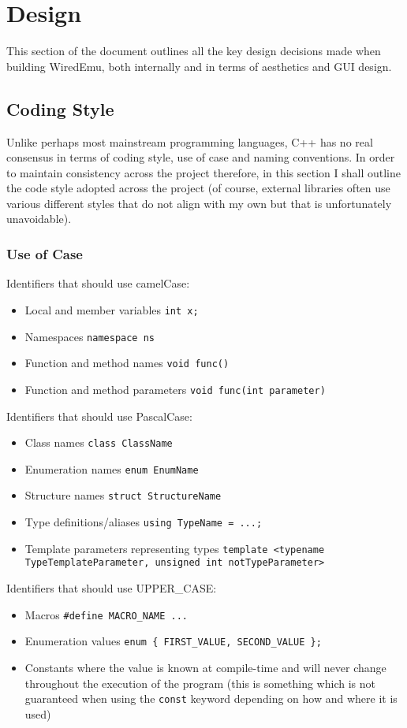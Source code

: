 \section{Design}

This section of the document outlines all the key design decisions made when building WiredEmu, both internally and in terms of aesthetics and GUI design.

\subsection{Coding Style}
	Unlike perhaps most mainstream programming languages, C++ has no real consensus in terms of coding style, use of case and naming conventions. In order to maintain consistency across the project therefore, in this section I shall outline the code style adopted across the project (of course, external libraries often use various different styles that do not align with my own but that is unfortunately unavoidable).

	\subsubsection{Use of Case}
		Identifiers that should use camelCase:
		\begin{itemize}
			\item Local and member variables \texttt{int x;}
			\item Namespaces \texttt{namespace ns}
			\item Function and method names \texttt{void func()}
			\item Function and method parameters \texttt{void func(int parameter)}
		\end{itemize}

		Identifiers that should use PascalCase:
		\begin{itemize}
			\item Class names \texttt{class ClassName}
			\item Enumeration names \texttt{enum EnumName}
			\item Structure names \texttt{struct StructureName}
			\item Type definitions/aliases \texttt{using TypeName = ...;}
			\item Template parameters representing types \texttt{template <typename TypeTemplateParameter, unsigned int notTypeParameter>}
		\end{itemize}

		Identifiers that should use UPPER\_CASE:
		\begin{itemize}
			\item Macros \texttt{\#define MACRO\_NAME ...}
			\item Enumeration values \texttt{enum \{ FIRST\_VALUE, SECOND\_VALUE \};}
			\item Constants where the value is known at compile-time and will never change throughout the execution of the program (this is something which is not guaranteed when using the \texttt{const} keyword depending on how and where it is used)
		\end{itemize}

